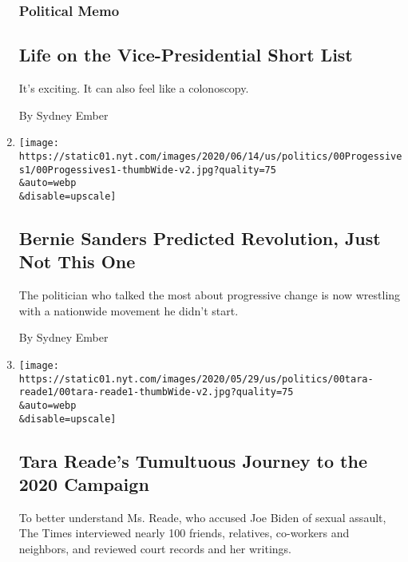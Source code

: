 \begin{enumerate}
  \hypertarget{political-memo}{%
  \subsubsection{Political Memo}\label{political-memo}}

  \hypertarget{life-on-the-vice-presidential-short-list}{%
  \subsection{Life on the Vice-Presidential Short
  List}\label{life-on-the-vice-presidential-short-list}}

  It's exciting. It can also feel like a colonoscopy.

  By Sydney Ember
\item
  \href{/2020/06/19/us/politics/bernie-sanders-protests.html}{}

  \texttt{[image: https://static01.nyt.com/images/2020/06/14/us/politics/00Progessives1/00Progessives1-thumbWide-v2.jpg?quality=75\\\&auto=webp\\\&disable=upscale]}

  \hypertarget{bernie-sanders-predicted-revolution-just-not-this-one}{%
  \subsection{Bernie Sanders Predicted Revolution, Just Not This
  One}\label{bernie-sanders-predicted-revolution-just-not-this-one}}

  The politician who talked the most about progressive change is now
  wrestling with a nationwide movement he didn't start.

  By Sydney Ember
\item
  \href{/2020/05/31/us/politics/tara-reade-joe-biden.html}{}

  \texttt{[image: https://static01.nyt.com/images/2020/05/29/us/politics/00tara-reade1/00tara-reade1-thumbWide-v2.jpg?quality=75\\\&auto=webp\\\&disable=upscale]}

  \hypertarget{tara-reades-tumultuous-journey-to-the-2020-campaign}{%
  \subsection{Tara Reade's Tumultuous Journey to the 2020
  Campaign}\label{tara-reades-tumultuous-journey-to-the-2020-campaign}}

  To better understand Ms. Reade, who accused Joe Biden of sexual
  assault, The Times interviewed nearly 100 friends, relatives,
  co-workers and neighbors, and reviewed court records and her writings.


\end{enumerate}
